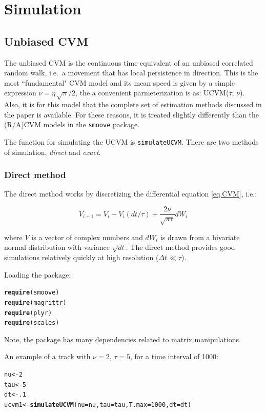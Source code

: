\documentclass[10pt]{article}\usepackage[]{graphicx}\usepackage[]{color}
\makeatletter
\newcommand{\hlnum}[1]{\textcolor[rgb]{0.686,0.059,0.569}{#1}}%
\newcommand{\hlstd}[1]{\textcolor[rgb]{0.345,0.345,0.345}{#1}}%
\newcommand{\hlkwb}[1]{\textcolor[rgb]{0.69,0.353,0.396}{#1}}%
\newcommand{\hlkwc}[1]{\textcolor[rgb]{0.333,0.667,0.333}{#1}}%
\newcommand{\hlkwd}[1]{\textcolor[rgb]{0.737,0.353,0.396}{\textbf{#1}}}%
\newenvironment{kframe}{%
 \def\at@end@of@kframe{}%
 \ifinner\ifhmode%
  \def\at@end@of@kframe{\end{minipage}}%
  \begin{minipage}{\columnwidth}%
 \fi\fi%
 \def\FrameCommand##1{\hskip\@totalleftmargin \hskip-\fboxsep
 \colorbox{shadecolor}{##1}\hskip-\fboxsep
     \hskip-\linewidth \hskip-\@totalleftmargin \hskip\columnwidth}%
 \MakeFramed {\advance\hsize-\width
   \@totalleftmargin\z@ \linewidth\hsize
   \@setminipage}}%
 {\par\unskip\endMakeFramed%
 \at@end@of@kframe}
\newenvironment{knitrout}{}{} %
\makeatother
\begin{document}
\section{Simulation}

\subsection{Unbiased CVM}
The unbiased CVM is the continuous time equivalent of an unbiased correlated random walk, i.e.~a movement that has local persistence in direction.  This is the most ``fundamental" CVM model and its mean speed is given by a simple expression $\nu = \eta \, \sqrt{\pi}/2$, the a convenient parmeterization is as: UCVM($\tau$, $\nu$).  Also, it is for this model that the complete set of estimation methods discussed in the paper is available.  For these reasons, it is treated slightly differently than the (R/A)CVM models in the {\tt smoove} package. 

The function for simulating the UCVM is {\tt simulateUCVM}.  There are two methods of simulation, \emph{direct} and \emph{exact}. 

\subsubsection{Direct method}

The direct method works by discretizing the differential equation \ref{eq.CVM}, i.e.:

$$V_{i+1} =  V_i - V_i (dt/\tau) + \frac{2 \nu}{\sqrt{\pi \tau}} dW_i$$

\noindent where $V$ is a vector of complex numbers and $dW_i$ is drawn from a bivariate normal distribution with variance $\sqrt{dt}$.  The direct method provides good simulations relatively quickly at high resolution ($\Delta t \ll \tau$).  

Loading the package:
\begin{knitrout}
\color{fgcolor}\begin{kframe}
\begin{alltt}
\hlkwd{require}\hlstd{(smoove)}
\hlkwd{require}\hlstd{(magrittr)}
\hlkwd{require}\hlstd{(plyr)}
\hlkwd{require}\hlstd{(scales)}
\end{alltt}
\end{kframe}
\end{knitrout}
Note, the package has many dependencies related to matrix manipulations.

An example of a track with $\nu=2$, $\tau=5$, for a time interval of 1000:
\begin{knitrout}
\color{fgcolor}\begin{kframe}
\begin{alltt}
\hlstd{nu} \hlkwb{<-} \hlnum{2}
\hlstd{tau} \hlkwb{<-} \hlnum{5}
\hlstd{dt} \hlkwb{<-} \hlnum{.1}
\hlstd{ucvm1} \hlkwb{<-} \hlkwd{simulateUCVM}\hlstd{(}\hlkwc{nu}\hlstd{=nu,} \hlkwc{tau}\hlstd{=tau,} \hlkwc{T.max} \hlstd{=} \hlnum{1000}\hlstd{,} \hlkwc{dt} \hlstd{= dt)}
\end{alltt}
\end{kframe}
\end{knitrout}
\end{document}

